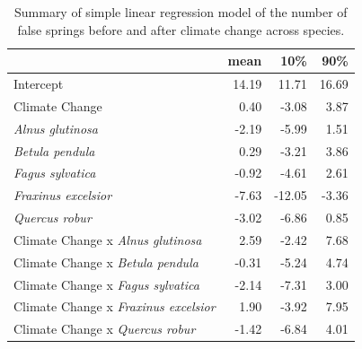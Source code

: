 \documentclass{article}\usepackage[]{graphicx}\usepackage[]{color}
\begin{document}
\begin{table}[H]
\centering
\caption{Summary of simple linear regression model of the number of false springs before and after climate change across species.} 
\label{tab:simpfs}
\begin{tabular}{lrrr}
  \hline
 & mean & 10\% & 90\% \\ 
  \hline
Intercept & 14.19 & 11.71 & 16.69 \\ 
  Climate Change & 0.40 & -3.08 & 3.87 \\ 
  \textit{Alnus glutinosa} & -2.19 & -5.99 & 1.51 \\ 
  \textit{Betula pendula} & 0.29 & -3.21 & 3.86 \\ 
  \textit{Fagus sylvatica} & -0.92 & -4.61 & 2.61 \\ 
  \textit{Fraxinus excelsior} & -7.63 & -12.05 & -3.36 \\ 
  \textit{Quercus robur} & -3.02 & -6.86 & 0.85 \\ 
  Climate Change x \textit{Alnus glutinosa} & 2.59 & -2.42 & 7.68 \\ 
  Climate Change x \textit{Betula pendula} & -0.31 & -5.24 & 4.74 \\ 
  Climate Change x \textit{Fagus sylvatica} & -2.14 & -7.31 & 3.00 \\ 
  Climate Change x \textit{Fraxinus excelsior} & 1.90 & -3.92 & 7.95 \\ 
  Climate Change x \textit{Quercus robur} & -1.42 & -6.84 & 4.01 \\ 
   \hline
\end{tabular}
\end{table}
\end{document}
